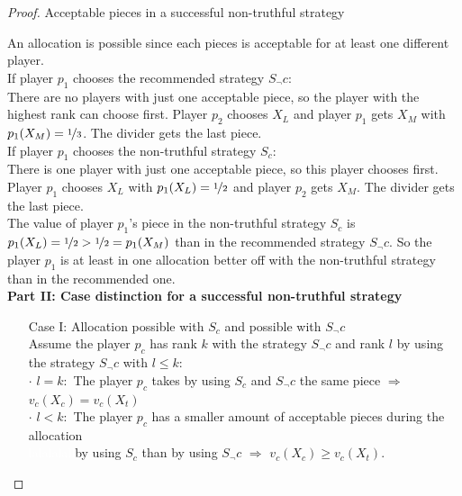 \begin{proof}
\begin{table}[htb]
\caption{Acceptable pieces in a successful non-truthful strategy}\label{Table11}
\end{table}
An allocation is possible since each pieces is acceptable for at least one different player.\\ \newline If player $p_1$ chooses the recommended strategy $S_\neg c$:\\
There are no players with just one acceptable piece, so the player with the highest rank can choose first.
Player $p_2$ chooses $X_L$ and player $p_1$ gets $X_M$ with $p_1(X_M)= \nicefrac{1}{3}$. The divider gets the last piece.\\
\newline
If player $p_1$ chooses the non-truthful strategy $S_c$:\\
There is one player with just one acceptable piece, so this player chooses first.
Player $p_1$ chooses $X_L$ with $p_1(X_L)= \nicefrac{1}{2}$ and player $p_2$ gets $X_M$. The divider gets the last piece.\\
The value of player $p_1$'s piece in the non-truthful strategy $S_c$ is $p_1(X_L)=\nicefrac{1}{2}>\nicefrac{1}{2}=p_1(X_M)$ than in the recommended strategy $S_\neg c$. So the player $p_1$ is at least in one allocation better off with the non-truthful strategy than in the recommended one.\\
\newline
\textbf{Part II: Case distinction for a successful non-truthful strategy} 
\begin{itemize}
\item[Case] I: Allocation possible with $S_c$ and possible with $S_\neg c$\\
Assume the player $p_c$ has rank $k$ with the strategy $S_\neg c$ and rank $l$ by using the strategy $S_\neg c$ with $l \leq k$:\\ 
$\cdot$ $l = k:$ The player $p_c$ takes by using $S_c$ and $S_\neg c$ the same piece $\Rightarrow$ $v_c(X_c)=v_c(X_t)$\\
$\cdot$ $l < k:$ The player $p_c$ has a smaller amount of acceptable pieces during the allocation\\\textcolor{white}{lalalalall}\textcolor{black}{}by using $S_c$ than by using $S_\neg c$ $\Rightarrow$ $v_c(X_c)\geq v_c(X_t)$.


\end{itemize}
\end{proof}
